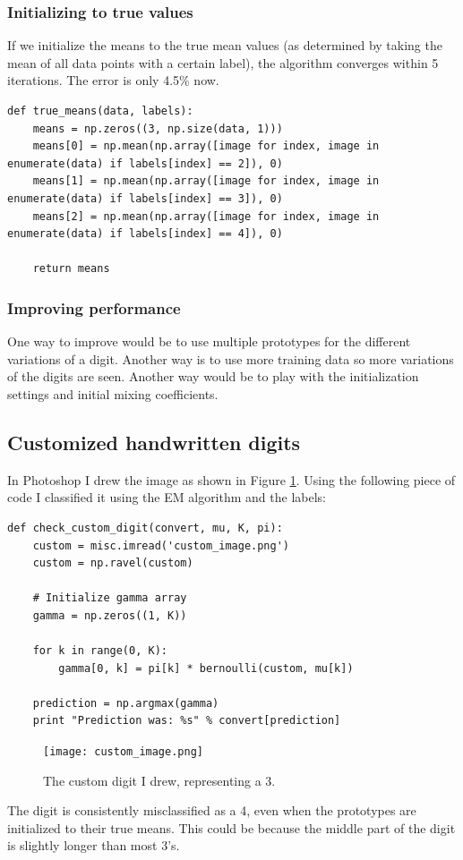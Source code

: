 \documentclass[paper=a4, fontsize=10pt]{scrartcl} %
\numberwithin{equation}{section} %
\numberwithin{figure}{section} %
\numberwithin{table}{section} %
\begin{document}
\subsubsection{Initializing to true values}
If we initialize the means to the true mean values (as determined by taking the mean of all data points with a certain label), the algorithm converges within 5 iterations. The error is only 4.5\% now.

\begin{verbatim}
def true_means(data, labels):
	means = np.zeros((3, np.size(data, 1)))
	means[0] = np.mean(np.array([image for index, image in enumerate(data) if labels[index] == 2]), 0)
	means[1] = np.mean(np.array([image for index, image in enumerate(data) if labels[index] == 3]), 0)
	means[2] = np.mean(np.array([image for index, image in enumerate(data) if labels[index] == 4]), 0)

	return means
\end{verbatim}

\subsubsection{Improving performance}
One way to improve would be to use multiple prototypes for the different variations of a digit. Another way is to use more training data so more variations of the digits are seen. Another way would be to play with the initialization settings and initial mixing coefficients.

\subsection{Customized handwritten digits}
In Photoshop I drew the image as shown in Figure \ref{custom}. Using the following piece of code I classified it using the EM algorithm and the labels:

\begin{verbatim}
def check_custom_digit(convert, mu, K, pi):
	custom = misc.imread('custom_image.png')
	custom = np.ravel(custom)

	# Initialize gamma array
	gamma = np.zeros((1, K))

	for k in range(0, K):
		gamma[0, k] = pi[k] * bernoulli(custom, mu[k])

	prediction = np.argmax(gamma)
	print "Prediction was: %s" % convert[prediction]
\end{verbatim}

\begin{figure}[H]
	\centering
    \texttt{[image: custom\_image.png]}
    \caption{The custom digit I drew, representing a 3.}
    \label{custom}
\end{figure}

The digit is consistently misclassified as a 4, even when the prototypes are initialized to their true means. This could be because the middle part of the digit is slightly longer than most 3's.
\end{document}
